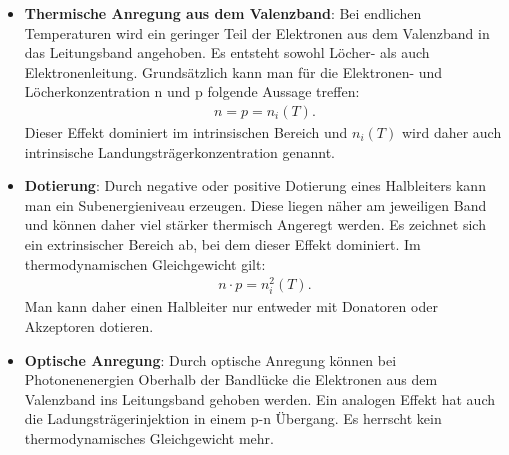 \begin{itemize}
    \item \textbf{Thermische Anregung aus dem Valenzband}: Bei endlichen Temperaturen wird ein geringer Teil der Elektronen aus dem Valenzband in das Leitungsband angehoben. Es entsteht sowohl Löcher- als auch Elektronenleitung. Grundsätzlich kann man für die Elektronen- und Löcherkonzentration n und p folgende Aussage treffen:
    \begin{align}
        n = p = n_i(T).
    \end{align}
    Dieser Effekt dominiert im intrinsischen Bereich und $n_i(T)$ wird daher auch intrinsische Landungsträgerkonzentration genannt. \\
    \item \textbf{Dotierung}: Durch negative oder positive Dotierung eines Halbleiters kann man ein Subenergieniveau erzeugen. Diese liegen näher am jeweiligen Band und können daher viel stärker thermisch Angeregt werden. Es zeichnet sich ein extrinsischer Bereich ab, bei dem dieser Effekt dominiert. Im thermodynamischen Gleichgewicht gilt:
    \begin{align}
        n \cdot p = n_i^2(T).
        \label{eq:dot}
    \end{align}
    Man kann daher einen Halbleiter nur entweder mit Donatoren oder Akzeptoren dotieren. \\
    \item \textbf{Optische Anregung}: Durch optische Anregung können bei Photonenenergien Oberhalb der Bandlücke die Elektronen aus dem Valenzband ins Leitungsband gehoben werden. Ein analogen Effekt hat auch die Ladungsträgerinjektion in einem p-n Übergang. Es herrscht kein thermodynamisches Gleichgewicht mehr.
\end{itemize}

